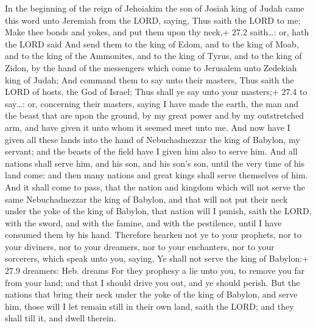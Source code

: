  In the beginning of the reign of Jehoiakim the son of
Josiah king of Judah came this word unto Jeremiah from the LORD, saying,
 Thus saith the LORD to me; Make thee bonds and yokes, and
put them upon thy neck,+ 27.2 saith\ldots: or, hath the LORD said
 And send them to the king of Edom, and to the king of Moab,
and to the king of the Ammonites, and to the king of Tyrus, and to the
king of Zidon, by the hand of the messengers which come to Jerusalem
unto Zedekiah king of Judah;  And command them to say unto
their masters, Thus saith the LORD of hosts, the God of Israel; Thus
shall ye say unto your masters;+ 27.4 to say\ldots: or, concerning their
masters, saying  I have made the earth, the man and the
beast that are upon the ground, by my great power and by my outstretched
arm, and have given it unto whom it seemed meet unto me. 
And now have I given all these lands into the hand of Nebuchadnezzar the
king of Babylon, my servant; and the beasts of the field have I given
him also to serve him.  And all nations shall serve him, and
his son, and his son's son, until the very time of his land come: and
then many nations and great kings shall serve themselves of him.
 And it shall come to pass, that the nation and kingdom
which will not serve the same Nebuchadnezzar the king of Babylon, and
that will not put their neck under the yoke of the king of Babylon, that
nation will I punish, saith the LORD, with the sword, and with the
famine, and with the pestilence, until I have consumed them by his hand.
 Therefore hearken not ye to your prophets, nor to your
diviners, nor to your dreamers, nor to your enchanters, nor to your
sorcerers, which speak unto you, saying, Ye shall not serve the king of
Babylon:+ 27.9 dreamers: Heb. dreams  For they prophesy a
lie unto you, to remove you far from your land; and that I should drive
you out, and ye should perish.  But the nations that bring
their neck under the yoke of the king of Babylon, and serve him, those
will I let remain still in their own land, saith the LORD; and they
shall till it, and dwell therein.

